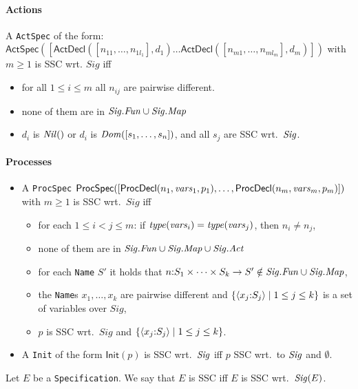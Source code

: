 \documentclass[fleqn,a4paper]{article}
\newcommand{\aterm}[1]{\mathsf{#1}}
\newcommand{\Sig}{\nm{Sig}}
\newcommand{\Fun}{\nm{Fun}}
\begin{document}
\paragraph{Actions}
  A {\tt ActSpec} of the form:\\
$\aterm{ActSpec}([\aterm{ActDecl}([n_{11},\dots,n_{1l_1}],d_1)\dots\aterm{ActDecl}([n_{m1},\dots,n_{ml_m}],d_m)])$
with $m\geq 1$ is SSC wrt. $Sig$ iff
\begin{itemize}
\item for all $1\leq i\leq m$ all $n_{ij}$ are pairwise different.
\item none of them are in $\Sig.\Fun\cup\Sig.\Map$
\item $d_i$ is $\mathit{Nil}()$ or $d_i$ is $\mathit{Dom}([s_1,\dots,s_n])$, and all $s_j$ are SSC wrt.\ $\Sig$.
\end{itemize}

\paragraph{Processes}
\begin{itemize}
\item
  A {\tt ProcSpec}
  $\aterm{ProcSpec}([\aterm{ProcDecl}(n_1,\nm{vars}_1,p_1),\dots,\aterm{ProcDecl}(n_m,\nm{vars}_m,p_m)])$
  with $m\geq 1$ is SSC wrt.\ $Sig$ iff
  \begin{itemize}
  \item
    for each $1\leq i<j\leq m$:
    if $\mathit{type}(\mathit{vars}_i)=\mathit{type}(\mathit{vars}_j)$, then $n_i\neq n_j$,
  \item none of them are in $\Sig.\Fun\cup\Sig.\Map\cup\Sig.\Act$
  \item
    for each {\tt Name} $S'$ it holds that $n\ap S_{1}\times\cdots\times
    S_{k}\rightarrow S'\notin \Sig.\Fun\cup\Sig.\Map$,
  \item the {\tt Name}s $x_{1},\ldots,x_{k}$ are pairwise different
    and $\{\langle x_{j}{:} S_{j}\rangle\mid 1\leq j\leq k\}$ is a set
    of variables over $Sig$,
  \item $p$ is SSC wrt.\ $Sig$ and $\{\langle
    x_{j}{:} S_{j}\rangle\mid 1\leq j\leq k\}$.
  \end{itemize}
\item
  A {\tt Init} of the form $\aterm{Init}(p)$ is SSC wrt.\ $\Sig$
  iff $p$ SSC wrt.\ to $\Sig$ and $\emptyset$.
\end{itemize}

\begin{defn}\label{def:SSC-mCRL}
  Let $E$ be a {\tt Specification}. We say that $E$ is SSC iff $E$ is SSC
  wrt.\ $\Sig(E)$.
\end{defn}
\end{document}
